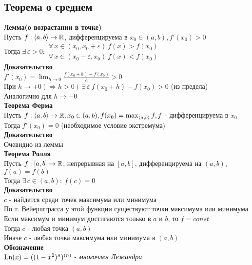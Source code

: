 \documentclass[12pt]{article}
\begin{document}
\subsection{Теорема о среднем}
\textbf{Лемма(о возрастании в точке)}\\
Пусть $f:\langle a, b\rangle \rightarrow \mathbb{R}$, дифференцируема в $x_0 \in (a,b), f'(x_0) > 0$\\
Тогда $\exists\,\varepsilon > 0:\begin{array}{cc}
     \forall\,x\in (x_0, x_0+\varepsilon)\ f(x) > f(x_0)\\
     \forall\,x\in (x_0-\varepsilon, x_0)\ f(x) < f(x_0)
\end{array}$\\
\textbf{Доказательство}\\
$f'(x_0) = \lim_{h\rightarrow 0} \frac{f(x_0+h)-f(x_0)}{h} > 0$\\
При $h \rightarrow +0 (\Rightarrow h > 0)\ \exists\,\varepsilon\ f(x_0+h) - f(x_0) > 0$ (из предела)\\
Аналогично для $h \rightarrow -0$\\
\textbf{Теорема Ферма}\\
Пусть $f:\langle a, b \rangle \rightarrow \mathbb{R}, x_0 \in (a,b), f(x_0) = \max_{\langle a, b \rangle} f, f$ - дифференцируема в $x_0$\\
Тогда $f'(x_0) = 0$ (необходимое условие экстремума)\\
\textbf{Доказательство}\\
Очевидно из леммы\\
\textbf{Теорема Ролля}\\
Пусть $f:[a,b] \rightarrow \mathbb{R}$, непрерывная на $[a,b]$, дифференцируема на $(a,b)$, $f(a) = f(b)$\\
Тогда $\exists\,c \in (a,b):\ f(c) = 0$\\
\textbf{Доказательство}\\
$c$ - найдется среди точек максимума или минимума\\
По т. Вейерштрасса у этой функции существуют точки максимума или минимума\\
Если максимум и минимум достигаются только в $a$ и $b$, то $f = const$\\
Тогда $c$ - любая точка $(a,b)$\\
Иначе $c$ - любая точка максимума или минимума в $(a,b)$\\
\textbf{Обозначение}\\
$\operatorname{Ln}(x) = ((1-x^2)^n)^{(n)}$ - \textit{многочлен Лежандра}\\
\end{document}
